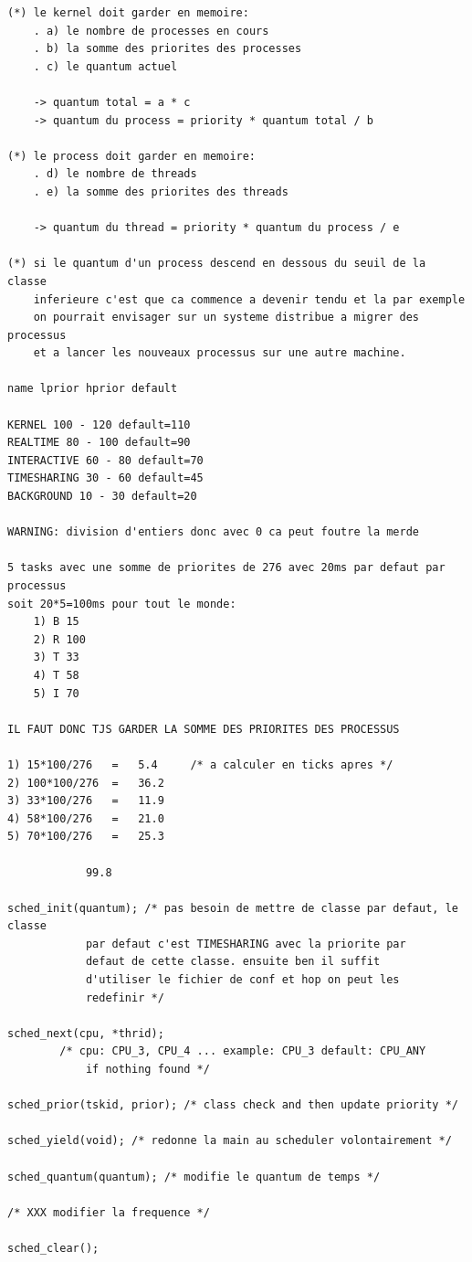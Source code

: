 \documentclass[10pt,a4wide]{article}
\begin{document}
\begin{verbatim}
(*) le kernel doit garder en memoire:
	. a) le nombre de processes en cours
	. b) la somme des priorites des processes
	. c) le quantum actuel

	-> quantum total = a * c
	-> quantum du process = priority * quantum total / b

(*) le process doit garder en memoire:
	. d) le nombre de threads
	. e) la somme des priorites des threads

	-> quantum du thread = priority * quantum du process / e

(*) si le quantum d'un process descend en dessous du seuil de la classe
    inferieure c'est que ca commence a devenir tendu et la par exemple
    on pourrait envisager sur un systeme distribue a migrer des processus
    et a lancer les nouveaux processus sur une autre machine.

name lprior hprior default

KERNEL 100 - 120 default=110
REALTIME 80 - 100 default=90
INTERACTIVE 60 - 80 default=70
TIMESHARING 30 - 60 default=45
BACKGROUND 10 - 30 default=20

WARNING: division d'entiers donc avec 0 ca peut foutre la merde

5 tasks avec une somme de priorites de 276 avec 20ms par defaut par processus
soit 20*5=100ms pour tout le monde:
	1) B 15
	2) R 100
	3) T 33
	4) T 58
	5) I 70

IL FAUT DONC TJS GARDER LA SOMME DES PRIORITES DES PROCESSUS

1) 15*100/276	=	5.4		/* a calculer en ticks apres */
2) 100*100/276	=	36.2
3) 33*100/276	=	11.9
4) 58*100/276	=	21.0
5) 70*100/276	=	25.3

			99.8

sched_init(quantum); /* pas besoin de mettre de classe par defaut, le classe
			par defaut c'est TIMESHARING avec la priorite par
			defaut de cette classe. ensuite ben il suffit
			d'utiliser le fichier de conf et hop on peut les
			redefinir */

sched_next(cpu, *thrid);
		/* cpu: CPU_3, CPU_4 ... example: CPU_3 default: CPU_ANY
		    if nothing found */

sched_prior(tskid, prior); /* class check and then update priority */

sched_yield(void); /* redonne la main au scheduler volontairement */

sched_quantum(quantum); /* modifie le quantum de temps */

/* XXX modifier la frequence */

sched_clear();


\end{verbatim}
\end{document}
